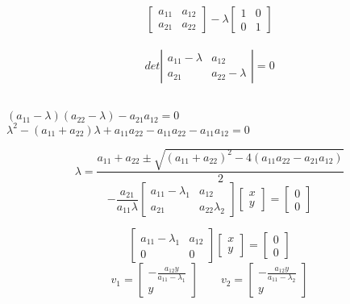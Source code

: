 \begin{displaymath}
\begin{bmatrix}
a_{11} & a_{12} \\
a_{21} & a_{22}
\end{bmatrix}-\lambda \begin{bmatrix}
1 & 0 \\
0 & 1 
\end{bmatrix}
\end{displaymath}
\\
\begin{displaymath}
det\left| \begin{matrix}
a_{11}-\lambda & a_{12} \\
a_{21} & a_{22}-\lambda
\end{matrix}\right| =0
\end{displaymath}
\\
\begin{center}
$(a_{11}-\lambda)(a_{22}-\lambda)-a_{21}a_{12}=0$\\
$\lambda ^2-(a_{11}+a_{22})\lambda +a_{11}a_{22}-a_{11}a_{22}-a_{11}a_{12}=0$\\
\end{center}
\begin{displaymath}
\lambda =\frac{a_{11}+a_{22}\pm\sqrt{(a_{11}+a_{22})^2-4(a_{11}a_{22}-a_{21}a_{12})}}{2}
\end{displaymath}
\begin{displaymath}
-\frac{a_{21}}{a_{11}\lambda}\begin{bmatrix}
a_{11}-\lambda_1 & a_{12} \\
a_{21} & a_{22}\lambda_2
\end{bmatrix}\begin{bmatrix}
x\\y
\end{bmatrix}=\begin{bmatrix}
0 \\ 0
\end{bmatrix}
\end{displaymath}

\begin{displaymath}\begin{bmatrix}
a_{11}-\lambda_1 & a_{12} \\
0 & 0
\end{bmatrix}\begin{bmatrix}
x\\y
\end{bmatrix}=\begin{bmatrix}
0 \\ 0
\end{bmatrix}
\end{displaymath}
\begin{displaymath}
v_1=\begin{bmatrix}
-\frac{a_{12}y}{a_{11}-\lambda_1} \\
y
\end{bmatrix} \qquad v_2=\begin{bmatrix}
-\frac{a_{12}y}{a_{11}-\lambda_2} \\
y
\end{bmatrix}
\end{displaymath}
